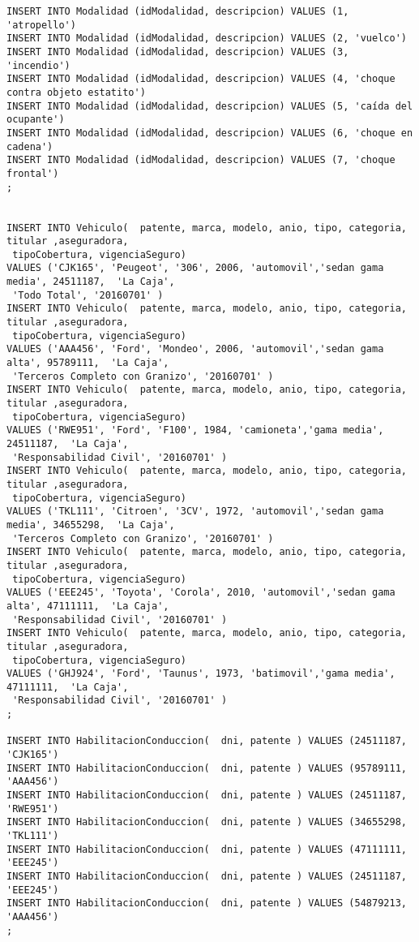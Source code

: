 {\begin{verbatim}
INSERT INTO Modalidad (idModalidad, descripcion) VALUES (1, 'atropello')
INSERT INTO Modalidad (idModalidad, descripcion) VALUES (2, 'vuelco')
INSERT INTO Modalidad (idModalidad, descripcion) VALUES (3, 'incendio')
INSERT INTO Modalidad (idModalidad, descripcion) VALUES (4, 'choque contra objeto estatito')
INSERT INTO Modalidad (idModalidad, descripcion) VALUES (5, 'caída del ocupante')
INSERT INTO Modalidad (idModalidad, descripcion) VALUES (6, 'choque en cadena')
INSERT INTO Modalidad (idModalidad, descripcion) VALUES (7, 'choque frontal')
;


INSERT INTO Vehiculo(  patente, marca, modelo, anio, tipo, categoria, titular ,aseguradora,
 tipoCobertura, vigenciaSeguro) 
VALUES ('CJK165', 'Peugeot', '306', 2006, 'automovil','sedan gama media', 24511187,  'La Caja',
 'Todo Total', '20160701' )
INSERT INTO Vehiculo(  patente, marca, modelo, anio, tipo, categoria, titular ,aseguradora,
 tipoCobertura, vigenciaSeguro) 
VALUES ('AAA456', 'Ford', 'Mondeo', 2006, 'automovil','sedan gama alta', 95789111,  'La Caja',
 'Terceros Completo con Granizo', '20160701' )
INSERT INTO Vehiculo(  patente, marca, modelo, anio, tipo, categoria, titular ,aseguradora,
 tipoCobertura, vigenciaSeguro) 
VALUES ('RWE951', 'Ford', 'F100', 1984, 'camioneta','gama media', 24511187,  'La Caja',
 'Responsabilidad Civil', '20160701' )
INSERT INTO Vehiculo(  patente, marca, modelo, anio, tipo, categoria, titular ,aseguradora,
 tipoCobertura, vigenciaSeguro) 
VALUES ('TKL111', 'Citroen', '3CV', 1972, 'automovil','sedan gama media', 34655298,  'La Caja',
 'Terceros Completo con Granizo', '20160701' )
INSERT INTO Vehiculo(  patente, marca, modelo, anio, tipo, categoria, titular ,aseguradora,
 tipoCobertura, vigenciaSeguro) 
VALUES ('EEE245', 'Toyota', 'Corola', 2010, 'automovil','sedan gama alta', 47111111,  'La Caja',
 'Responsabilidad Civil', '20160701' )
INSERT INTO Vehiculo(  patente, marca, modelo, anio, tipo, categoria, titular ,aseguradora,
 tipoCobertura, vigenciaSeguro) 
VALUES ('GHJ924', 'Ford', 'Taunus', 1973, 'batimovil','gama media', 47111111,  'La Caja',
 'Responsabilidad Civil', '20160701' )
;

INSERT INTO HabilitacionConduccion(  dni, patente ) VALUES (24511187, 'CJK165')
INSERT INTO HabilitacionConduccion(  dni, patente ) VALUES (95789111, 'AAA456')
INSERT INTO HabilitacionConduccion(  dni, patente ) VALUES (24511187, 'RWE951')
INSERT INTO HabilitacionConduccion(  dni, patente ) VALUES (34655298, 'TKL111')
INSERT INTO HabilitacionConduccion(  dni, patente ) VALUES (47111111, 'EEE245')
INSERT INTO HabilitacionConduccion(  dni, patente ) VALUES (24511187, 'EEE245')
INSERT INTO HabilitacionConduccion(  dni, patente ) VALUES (54879213, 'AAA456')
;



\end{verbatim}}
